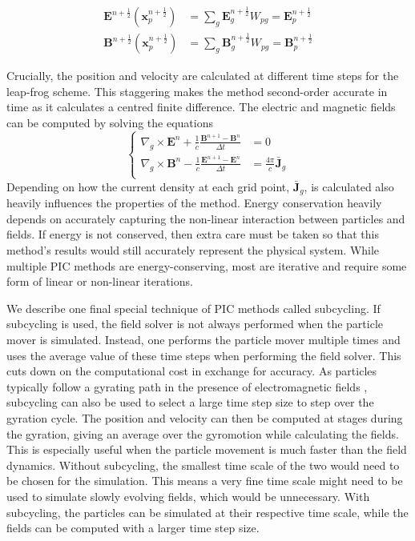 \begin{equation}
\begin{split}
    \textbf{E}^{n+\frac{1}{2}}(\textbf{x}_p^{n+\frac{1}{2}}) &= \sum_g \textbf{E}_g^{n+\frac{1}{2}} W_{pg} = \textbf{E}_p^{n+\frac{1}{2}}\\
    \textbf{B}^{n+\frac{1}{2}}(\textbf{x}_p^{n+\frac{1}{2}}) &= \sum_g \textbf{B}_g^{n+\frac{1}{2}} W_{pg} = \textbf{B}_p^{n+\frac{1}{2}}
\end{split}
\end{equation} 

Crucially, the position and velocity are calculated at different time steps for the leap-frog scheme. This staggering makes the method second-order accurate in time as it calculates a centred finite difference. The electric and magnetic fields can be computed by solving the equations \cite{jiang_origin_1996}
\begin{equation}
\left\{\begin{aligned}
	\nabla_g \times \mathbf{E}^{n} +\frac{1}{c}\frac{\mathbf{B}^{n+1} - \mathbf{B}^{n}}{\Delta t} &= 0 \\
	\nabla_g \times \mathbf{B}^{n} -\frac{1}{c}\frac{\mathbf{E}^{n+1} - \mathbf{E}^{n}}{\Delta t} &= \frac{4 \pi}{c}\bar{\mathbf{J}}_g\\
\end{aligned}\right.
\end{equation}
Depending on how the current density at each grid point, $\bar{\mathbf{J}}_g$, is calculated also heavily influences the properties of the method. Energy conservation heavily depends on accurately capturing the non-linear interaction between particles and fields. If energy is not conserved, then extra care must be taken so that this method's results would still accurately represent the physical system. While multiple PIC methods are energy-conserving, most are iterative and require some form of linear or non-linear iterations.

We describe one final special technique of PIC methods called subcycling. If subcycling is used, the field solver is not always performed when the particle mover is simulated. Instead, one performs the particle mover multiple times and uses the average value of these time steps when performing the field solver. This cuts down on the computational cost in exchange for accuracy. As particles typically follow a gyrating path in the presence of electromagnetic fields \cite{chen_lecture_2003}, subcycling can also be used to select a large time step size to step over the gyration cycle. The position and velocity can then be computed at stages during the gyration, giving an average over the gyromotion while calculating the fields. This is especially useful when the particle movement is much faster than the field dynamics. Without subcycling, the smallest time scale of the two would need to be chosen for the simulation. This means a very fine time scale might need to be used to simulate slowly evolving fields, which would be unnecessary. With subcycling, the particles can be simulated at their respective time scale, while the fields can be computed with a larger time step size.
\cite{chen_implicit_2023, lapenta_advances_2023}

